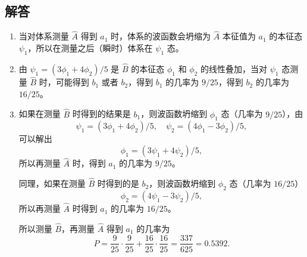 \subsection*{解答}
\begin{enumerate}
	\item 当对体系测量 $\hat{A}$ 得到 $a_{1}$ 时，体系的波函数会坍缩为 $\hat{A}$ 本征值为 $a_{1}$ 的本征态 $\psi_{1}$，所以在测量之后（瞬时）体系在 $\psi_{1}$ 态。
	
	\item 由 $\psi_{1} = (3\phi_{1} + 4\phi_{2})/5$ 是 $\hat{B}$ 的本征态 $\phi_{1}$ 和 $\phi_{2}$ 的线性叠加，当对 $\psi_{1}$ 态测量 $\hat{B}$ 时，可能得到 $b_{1}$ 或者 $b_{2}$，得到 $b_{1}$ 的几率为 $9/25$，得到 $b_{2}$ 的几率为 $16/25$。
	
	\item 如果在测量 $\hat{B}$ 时得到的结果是 $b_{1}$，则波函数坍缩到 $\phi_{1}$ 态（几率为 $9/25$），由
	\[
	\psi_{1} = (3\phi_{1} + 4\phi_{2})/5, \quad \psi_{2} = (4\phi_{1} - 3\phi_{2})/5,
	\]
	可以解出
	\[
	\phi_{1} = (3\psi_{1} + 4\psi_{2})/5,
	\]
	所以再测量 $\hat{A}$ 时，得到 $a_{1}$ 的几率为 $9/25$。
	
	同理，如果在测量 $\hat{B}$ 时得到的是 $b_{2}$，则波函数坍缩到 $\phi_{2}$ 态（几率为 $16/25$）
	\[
	\phi_{2} = (4\psi_{1} - 3\psi_{2})/5,
	\]
	所以再测量 $\hat{A}$ 时得到 $a_{1}$ 的几率为 $16/25$。
	
	所以测量 $\hat{B}$，再测量 $\hat{A}$ 得到 $a_{1}$ 的几率为
	\[
	P = \frac{9}{25} \cdot \frac{9}{25} + \frac{16}{25} \cdot \frac{16}{25} = \frac{337}{625} = 0.5392.
	\]
\end{enumerate}